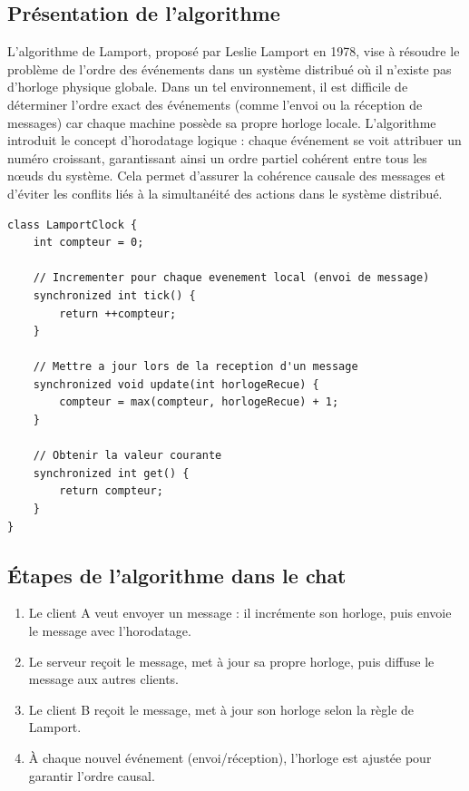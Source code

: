 \documentclass[a4paper,12pt]{article}
\begin{document}
\subsection{Présentation de l'algorithme}
L'algorithme de Lamport, proposé par Leslie Lamport en 1978, vise à résoudre le problème de l'ordre des événements dans un système distribué où il n'existe pas d'horloge physique globale. Dans un tel environnement, il est difficile de déterminer l'ordre exact des événements (comme l'envoi ou la réception de messages) car chaque machine possède sa propre horloge locale. L'algorithme introduit le concept d'horodatage logique : chaque événement se voit attribuer un numéro croissant, garantissant ainsi un ordre partiel cohérent entre tous les nœuds du système. Cela permet d'assurer la cohérence causale des messages et d'éviter les conflits liés à la simultanéité des actions dans le système distribué.
\begin{lstlisting}[caption={Horloge logique de Lamport (pseudo-code)}]
class LamportClock {
    int compteur = 0;

    // Incrementer pour chaque evenement local (envoi de message)
    synchronized int tick() {
        return ++compteur;
    }

    // Mettre a jour lors de la reception d'un message
    synchronized void update(int horlogeRecue) {
        compteur = max(compteur, horlogeRecue) + 1;
    }

    // Obtenir la valeur courante
    synchronized int get() {
        return compteur;
    }
}
\end{lstlisting}

\subsection{Étapes de l'algorithme dans le chat}
\begin{enumerate}
    \item Le client A veut envoyer un message : il incrémente son horloge, puis envoie le message avec l'horodatage.
    \item Le serveur reçoit le message, met à jour sa propre horloge, puis diffuse le message aux autres clients.
    \item Le client B reçoit le message, met à jour son horloge selon la règle de Lamport.
    \item À chaque nouvel événement (envoi/réception), l'horloge est ajustée pour garantir l'ordre causal.
\end{enumerate}
\end{document}
